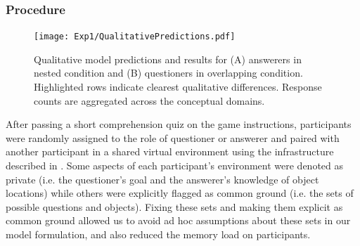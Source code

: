 \documentclass[12pt, floatsintext, jou]{apa6}
\begin{document}

\subsubsection{Procedure}

\begin{figure}[h]
\begin{center}
\texttt{[image: Exp1/QualitativePredictions.pdf]}
\end{center}
\caption{\footnotesize  Qualitative model predictions and results for (A) answerers in nested condition and (B) questioners in overlapping condition. Highlighted rows indicate clearest qualitative differences. Response counts are aggregated across the conceptual domains.}
\label{fig:exp1qualitative}
\end{figure}

After passing a short comprehension quiz on the game instructions, participants were randomly assigned to the role of questioner or answerer and paired with another participant in a shared virtual environment using the infrastructure described in . 
Some aspects of each participant's environment were denoted as private (i.e. the questioner's goal and the answerer's knowledge of object locations) while others were explicitly flagged as common ground (i.e. the sets of possible questions and objects).
Fixing these sets and making them explicit as common ground allowed us to avoid ad hoc assumptions about these sets in our model formulation, and also reduced the memory load on participants.
\end{document}
